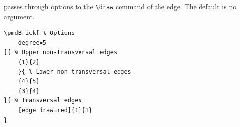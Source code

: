 \documentclass{ltxdoc}
\begin{document}
passes through options to the \verb`\draw` command of the edge. The default is no argument.
\begin{center}
    \begin{minipage}{\dimexpr0.85\textwidth-2\fboxrule-2\fboxsep\relax}
        \begin{minipage}[c]{0.4\linewidth}
\begin{verbatim}
\pmdBrick[ % Options
    degree=5
]{ % Upper non-transversal edges
    {1}{2}
    }{ % Lower non-transversal edges
    {4}{5}
    {3}{4}
}{ % Transversal edges
    [edge draw=red]{1}{1}
}
\end{verbatim}
        \end{minipage}
        \hfill
        \begin{minipage}[c]{0.4\linewidth}
        \end{minipage}
    \end{minipage}%
\end{center}
\end{document}
